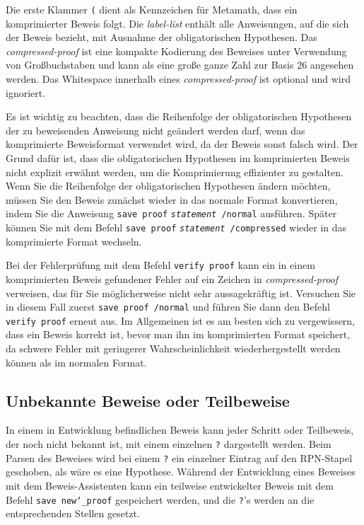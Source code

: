Die  erste Klammer \texttt{(} dient als Kennzeichen für Metamath, dass ein komprimierter Beweis folgt.  Die {\em label-list} enthält alle Anweisungen, auf die sich der Beweis bezieht, mit Ausnahme der obligatorischen Hypothesen.  Das {\em compressed-proof} ist eine kompakte Kodierung des Beweises unter Verwendung von Großbuchstaben und kann als eine große ganze Zahl zur Basis 26 angesehen werden.  Das Whitespace innerhalb eines {\em compressed-proof} ist optional und wird ignoriert.

Es ist wichtig zu beachten, dass die Reihenfolge der obligatorischen Hypothesen der zu beweisenden Anweisung nicht geändert werden darf, wenn das komprimierte Beweisformat verwendet wird, da der Beweis sonst falsch wird.  Der Grund dafür ist, dass die obligatorischen Hypothesen im komprimierten Beweis nicht explizit erwähnt werden, um die Komprimierung effizienter zu gestalten. Wenn Sie die Reihenfolge der obligatorischen Hypothesen ändern möchten, müssen Sie den Beweis zunächst wieder in das normale Format konvertieren, indem Sie die Anweisung \texttt{save proof} \texttt{{\em statement} /normal} ausführen. Später können Sie mit dem Befehl \texttt{save proof} \texttt{{\em statement} /compressed} wieder in das komprimierte Format wechseln.

Bei der Fehlerprüfung mit dem Befehl \texttt{verify proof} kann ein in einem komprimierten Beweis gefundener Fehler auf ein Zeichen in {\em compressed-proof} verweisen, das für Sie möglicherweise nicht sehr aussagekräftig ist.  Versuchen Sie in diesem Fall zuerst \texttt{save proof /normal} und führen Sie dann den Befehl \texttt{verify proof} erneut aus.  Im Allgemeinen ist es am besten sich zu vergewissern, dass ein Beweis korrekt ist, bevor man ihn im komprimierten Format speichert, da schwere Fehler mit geringerer Wahrscheinlichkeit wiederhergestellt werden können als im normalen Format.

\subsection{Unbekannte Beweise oder Teilbeweise}\label{unknown}

In einem in Entwicklung befindlichen Beweis kann jeder Schritt oder Teilbeweis, der noch nicht bekannt ist, mit einem einzelnen \texttt{?} dargestellt werden.  Beim Parsen des Beweises wird bei einem \texttt{?}\index{\texttt{]}@\texttt{?}\ innerhalb von Beweisen} ein einzelner Eintrag auf den RPN-Stapel geschoben, als wäre es eine Hypothese.  Während der Entwicklung eines Beweises mit dem Beweis-Assistenten kann ein teilweise entwickelter Beweis mit dem Befehl \texttt{save new{\char`\_}proof} gespeichert werden, und die \texttt{?}'s werden an die entsprechenden Stellen gesetzt.

